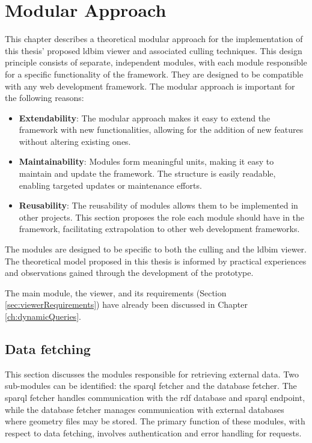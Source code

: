 \chapter{Modular Approach} \label{ch:modularApproach}
This chapter describes a theoretical modular approach for the implementation of this thesis' proposed \ac{ldbim} viewer and associated culling techniques. This design principle consists of separate, independent modules, with each module responsible for a specific functionality of the framework. They are designed to be compatible with any web development framework. The modular approach is important for the following reasons:

\begin{itemize}
  \item \textbf{Extendability}: The modular approach makes it easy to extend the framework with new functionalities, allowing for the addition of new features without altering existing ones.
  \item \textbf{Maintainability}: Modules form meaningful units, making it easy to maintain and update the framework. The structure is easily readable, enabling targeted updates or maintenance efforts.
  \item \textbf{Reusability}: The reusability of modules allows them to be implemented in other projects. This section proposes the role each module should have in the framework, facilitating extrapolation to other web development frameworks.
\end{itemize}

The modules are designed to be specific to both the culling and the \ac{ldbim} viewer. The theoretical model proposed in this thesis is informed by practical experiences and observations gained through the development of the prototype.

The main module, the viewer, and its requirements (Section \ref{sec:viewerRequirements}) have already been discussed in Chapter \ref{ch:dynamicQueries}.

\section{Data fetching}
This section discusses the modules responsible for retrieving external data. Two sub-modules can be identified: the \ac{sparql} fetcher and the database fetcher. The \ac{sparql} fetcher handles communication with the \ac{rdf} database and \ac{sparql} endpoint, while the database fetcher manages communication with external databases where geometry files may be stored. The primary function of these modules, with respect to data fetching, involves authentication and error handling for requests.

